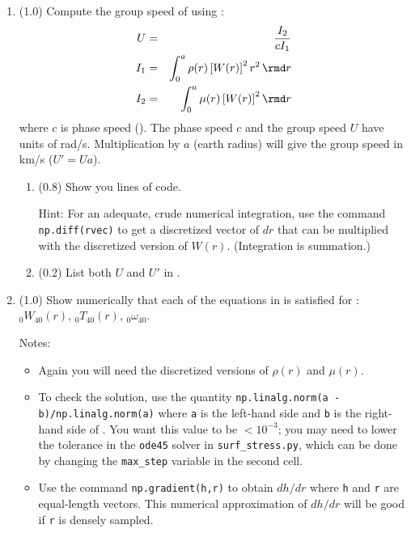 \documentclass[11pt,titlepage,fleqn]{article}
\newcommand{\tfileB}{{\tt surf\_stress.py}}
\begin{document}
\begin{enumerate}

\item (1.0) Compute the group speed of  using \citep[][Eq. 11.67]{DT}:
%
\begin{eqnarray}
U &=& \frac{I_2}{cI_1}
\label{group}
\\
I_1 &=& \int_0^a \rho(r) \left[W(r)\right]^2 r^2 \, \rmd r
\\
I_2 &=& \int_0^a \mu(r) \left[W(r)\right]^2 \rmd r
\end{eqnarray}
%
where $c$ is phase speed (). %
The phase speed $c$ and the group speed $U$ have units of rad/s. Multiplication by $a$ (earth radius) will give the group speed in km/s ($U' = Ua$).
%
\begin{enumerate}
\item (0.8) Show you lines of code.

Hint: For an adequate, crude numerical integration, use the command \verb+np.diff(rvec)+ to get a discretized vector of $dr$ that can be multiplied with the discretized version of $W(r)$. (Integration is summation.)

\item (0.2) List both $U$ and $U'$ in .
\end{enumerate}

\label{prob:0T40_cubic_group}

\pagebreak
\item (1.0) Show numerically that each of the equations in  is satisfied for : $_0W_{40}(r)$, $_0T_{40}(r)$, $_0\omega_{40}$.

Notes:
%
\begin{itemize}
\item Again you will need the discretized versions of $\rho(r)$ and $\mu(r)$.

\item To check the solution, use the quantity \verb+np.linalg.norm(a - b)/np.linalg.norm(a)+ where \verb+a+ is the left-hand side and \verb+b+ is the right-hand side of . You want this value to be $< 10^{-3}$; you may need to lower the tolerance in the \verb+ode45+ solver in \tfileB, which can be done by changing the \verb+max_step+ variable in the second cell.

\item Use the command \verb+np.gradient(h,r)+ to obtain $dh/dr$ where \verb+h+ and \verb+r+ are equal-length vectors. This numerical approximation of $dh/dr$ will be good if \verb+r+ is densely sampled.
\end{itemize}


\end{enumerate}
\end{document}
